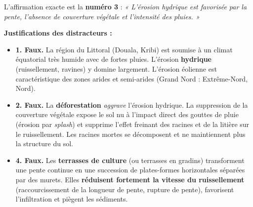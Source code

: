 \documentclass[11pt]{article}
\begin{document}
\begin{corrige}
L'affirmation exacte est la \textbf{numéro 3} : \emph{« L'érosion hydrique est favorisée par la pente, l'absence de couverture végétale et l'intensité des pluies. »}

\medskip
\textbf{Justifications des distracteurs :}
\begin{itemize}
    \item \textbf{1. Faux.} La région du Littoral (Douala, Kribi) est soumise à un climat équatorial très humide avec de fortes pluies. L'érosion \textbf{hydrique} (ruissellement, ravines) y domine largement. L'érosion éolienne est caractéristique des zones arides et semi-arides (Grand Nord : Extrême-Nord, Nord).
    \item \textbf{2. Faux.} La \textbf{déforestation} \emph{aggrave} l'érosion hydrique. La suppression de la couverture végétale expose le sol nu à l'impact direct des gouttes de pluie (érosion par \emph{splash}) et supprime l'effet freinant des racines et de la litière sur le ruissellement. Les racines mortes se décomposent et ne maintiennent plus la structure du sol.
    \item \textbf{4. Faux.} Les \textbf{terrasses de culture} (ou terrasses en gradins) transforment une pente continue en une succession de plates-formes horizontales séparées par des murets. Elles \textbf{réduisent fortement la vitesse du ruissellement} (raccourcissement de la longueur de pente, rupture de pente), favorisent l'infiltration et piègent les sédiments.
\end{itemize}
\end{corrige}
\end{document}
